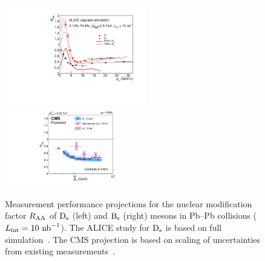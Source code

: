 \begin{figure}[!t]
\centering
\includegraphics[width=0.55\textwidth]{hf/figures/ALICEUpgrade_D0_Ds_RAA_YR.pdf}
\includegraphics[width=0.44\textwidth]{hf/figures/CMS_B_Bs_RAA.pdf}
\caption{Measurement performance projections for the nuclear modification factor  $R_{\rm AA}$ of $\rm D_s$ (left) and $\rm B_s$ (right) mesons in Pb--Pb collisions ($L_{\rm int }=10~{\rm nb}^{-1}$). The ALICE study for $\rm D_s$ is based on full simulation~\cite{Abelev:1625842}. The CMS projection is based on scaling of uncertainties from existing measurements~\cite{CMS-PAS-FTR-17-002}.}
\label{fig:HFDsBs}
\end {figure}


